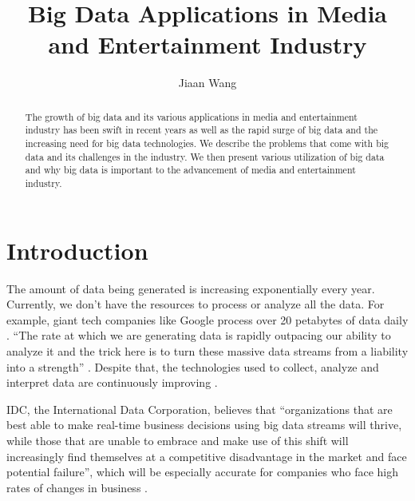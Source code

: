 \documentclass[sigconf]{acmart}
\begin{document}
\title{Big Data Applications in Media and Entertainment Industry}


\author{Jiaan Wang}


\begin{abstract}

    The growth of big data and its various applications in media and entertainment 
    industry has been swift in recent years as well as the rapid surge of big data 
    and the increasing need for big data technologies. We describe the problems 
    that come with big data and its challenges in the industry. We then present 
    various utilization of big data and why big data is important to the advancement 
    of media and entertainment industry. 
    
\end{abstract}


\maketitle

\section{Introduction}

The amount of data being generated is increasing exponentially every year. Currently, we don't have the resources to process or analyze all the data. For example, giant tech companies like Google process over 20 petabytes of data daily \cite{Schlieski2012data}. ``The rate at which we are generating data is rapidly outpacing our ability to analyze it and the trick here is to turn these massive data streams from a liability into a strength'' \cite{Browning2015laptop}. Despite that, the technologies used to collect, analyze and interpret data are continuously improving \cite{Schlieski2012data}.

IDC, the International Data Corporation, believes that ``organizations that are best able to make real-time business decisions using big data streams will thrive, while those that are unable to embrace and make use of this shift will increasingly find themselves at a competitive disadvantage in the market and face potential failure'', which will be especially accurate for companies who face high rates of changes in business \cite{Villars2011care}.
\end{document}
